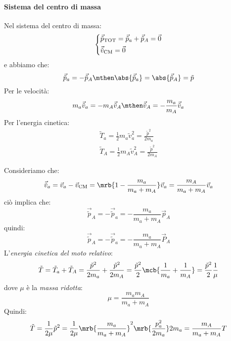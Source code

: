 \paragraph{Sistema del centro di massa}
Nel sistema del centro di massa:
\[
  \begin{dcases}
    \vec{\tilde p}_\text{TOT} = \vec{\tilde p}_{a} + \vec{\tilde p}_{A} =
    \vec{0}
    \\
    \vec{\tilde v}_\text{CM} = \vec{0}
  \end{dcases}
\]
e abbiamo che:
\[
  \vec{\tilde p}_{a} = -\vec{\tilde p}_{A}
  \mthen
  \abs{\vec{\tilde p}_{a}} = \abs{\vec{\tilde p}_{A}} = \tilde p
\]
Per le velocità:
\[
  m_a \vec{\tilde v}_{a} = - m_A \vec{\tilde v}_{A}
  \mthen
  \vec{\tilde v}_{A} = - \frac{m_a}{m_A} \vec{\tilde v}_{a}
\]
Per l'energia cinetica:
\begin{align*}
  \tilde T_a = \frac{1}{2} m_a \tilde v_a^2 = \frac{\tilde p^2}{2 m_a}
  \\
  \tilde T_A = \frac{1}{2} m_A \tilde v_A^2 = \frac{\tilde p^2}{2 m_A}
\end{align*}

Consideriamo che:
\[
  \vec{\tilde v}_{a} = \vec{v}_{a} - \vec{v}_\text{CM} = \mrb{1 -
  \frac{m_a}{m_a + m_A}} \vec{v}_{a} = \frac{m_A}{m_a + m_A} \vec{v}_{a}
\]
ciò implica che:
\[
  \vec{\tilde p}_{A} = - \vec{\tilde p}_{a} = - \frac{m_a}{m_a + m_A}
  \vec{p}_{A}
\]
quindi:
\[
  \vec{\tilde p}_{A} = - \vec{\tilde p}_{a} = - \frac{m_a}{m_a + m_A}
  \vec{P}_{A}
\]
L'\textit{energia cinetica del moto relativo}:
\[
  \tilde T = \tilde T_a + \tilde T_A = \frac{\tilde p^2}{2 m_a} + \frac{\tilde
  p^2}{2 m_A} = \frac{\tilde p^2}{2} \mcb{\frac{1}{m_a} + \frac{1}{m_A}} =
  \frac{\tilde p^2}{2} \frac{1}{\mu}
\]
dove $\mu$ è la \textit{massa ridotta}:
\[
  \mu = \frac{m_a m_A}{m_a + m_A}
\]
Quindi:
\[
  \tilde T = \frac{1}{2 \mu} \tilde p^2 = \frac{1}{2 \mu} \mrb{\frac{m_a}{m_a +
  m_A}}^{2} \mrb{\frac{p_a^2}{2 m_a}} 2 m_a = \frac{m_A}{m_a + m_A} T
\]

